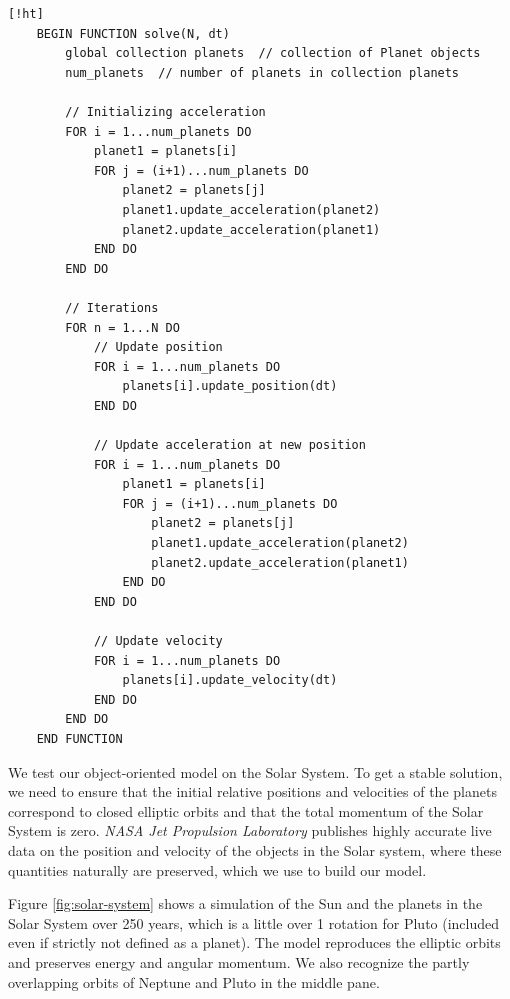 \documentclass[]{article}
\begin{document}
\begin{lstlisting}[caption={The \lstinline|Solver| object's solve() service for executing the Velocity Verlet algorithm on the $n$-body problem.},label={lst:solve}] [!ht]
	BEGIN FUNCTION solve(N, dt)
		global collection planets  // collection of Planet objects
		num_planets  // number of planets in collection planets
		
		// Initializing acceleration
		FOR i = 1...num_planets DO
			planet1 = planets[i]
			FOR j = (i+1)...num_planets DO
				planet2 = planets[j]
				planet1.update_acceleration(planet2)
				planet2.update_acceleration(planet1)
			END DO
		END DO
		
		// Iterations
		FOR n = 1...N DO
			// Update position
			FOR i = 1...num_planets DO
				planets[i].update_position(dt)
			END DO
			
			// Update acceleration at new position
			FOR i = 1...num_planets DO
				planet1 = planets[i]
				FOR j = (i+1)...num_planets DO
					planet2 = planets[j]
					planet1.update_acceleration(planet2)
					planet2.update_acceleration(planet1)
				END DO
			END DO
			
			// Update velocity
			FOR i = 1...num_planets DO
				planets[i].update_velocity(dt)
			END DO
		END DO
	END FUNCTION
\end{lstlisting}

We test our object-oriented model on the Solar System. To get a stable solution, we need to ensure that the initial relative positions and velocities of the planets correspond to closed elliptic orbits and that the total momentum of the Solar System is zero. \textit{NASA Jet Propulsion Laboratory} \cite{nasa-jpl} publishes highly accurate live data on the position and velocity of the objects in the Solar system, where these quantities naturally are preserved, which we use to build our model. 

Figure \ref{fig:solar-system} shows a simulation of the Sun and the planets in the Solar System over 250 years, which is a little over 1 rotation for Pluto (included even if strictly not defined as a planet). The model reproduces the elliptic orbits and preserves energy and angular momentum. We also recognize the partly overlapping orbits of Neptune and Pluto in the middle pane.
\end{document}
